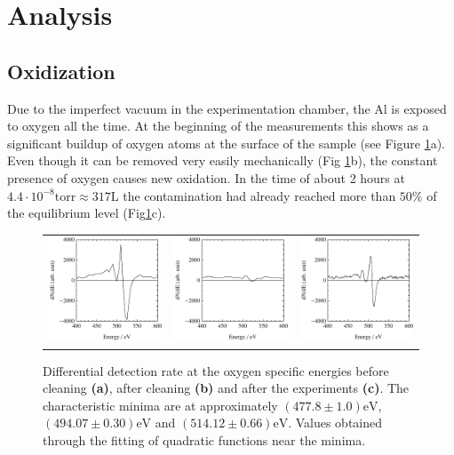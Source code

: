 \documentclass[a4paper]{scrartcl}
\numberwithin{equation}{section}
\numberwithin{figure}{section}
\numberwithin{table}{section}
\begin{document}
\clearpage

\section{Analysis}
\subsection{Oxidization}
Due to the imperfect vacuum in the experimentation chamber, the Al is exposed to oxygen all the time. At the beginning of the measurements this shows as a significant buildup of oxygen atoms at the surface of the sample (see Figure \ref{fig:putz}a). Even though it can be removed very easily mechanically (Fig \ref{fig:putz}b), the constant presence of oxygen causes new oxidation. In the time of about 2 hours at $4.4 \cdot 10^{-8} \text{torr} \approx 317 \text{L}$ the contamination had already reached more than $50\%$ of the equilibrium level (Fig\ref{fig:putz}c).
\begin{figure}[!h]
        \begin{center}
        \begin{tabular}{l c r}
        		\includegraphics[width=0.31\linewidth]{pic/putz1.pdf}
       	&
       		\includegraphics[width=0.31\linewidth]{pic/putz2.pdf}
			&
				\includegraphics[width=0.31\linewidth]{pic/putzAfter.pdf}
		  \end{tabular}
        \end{center}
        \caption[differential detection rate at the O specific energies]{
			\small Differential detection rate at the oxygen specific energies before cleaning \textbf{(a)}, after cleaning \textbf{(b)} and after the experiments \textbf{(c)}. The characteristic minima are at approximately $(477.8\pm1.0)\text{eV}$, $(494.07\pm0.30)\text{eV}$ and $(514.12\pm0.66)\text{eV}$. Values obtained through the fitting of quadratic functions near the minima.
        }
        \label{fig:putz}
\end{figure}
\FloatBarrier
\end{document}
